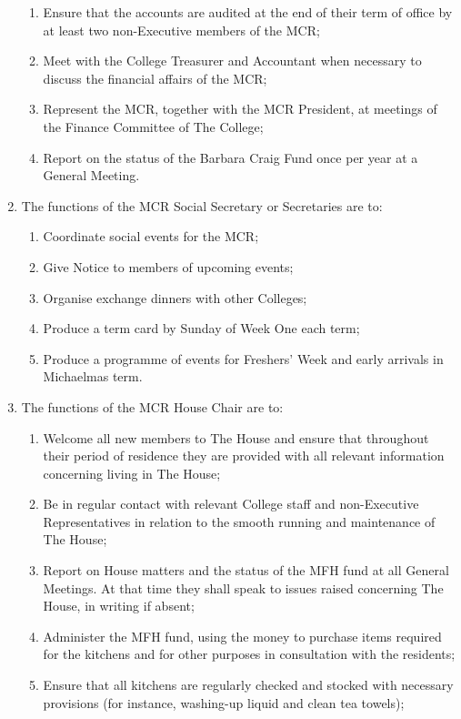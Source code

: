 \documentclass[11pt, a4paper]{article}
\begin{document}
\begin{enumerate}
\begin{enumerate}
        \item Ensure that the accounts are audited at the end of their term of office by at least two non-Executive members of the MCR;
        \item Meet with the College Treasurer and Accountant when necessary to discuss the financial affairs of the MCR;
        \item Represent the MCR, together with the MCR President, at meetings of the Finance Committee of The College;
        \item Report on the status of the Barbara Craig Fund once per year at a General Meeting.
    \end{enumerate}
    \item The functions of the MCR Social Secretary or Secretaries are to:
    \begin{enumerate}
        \item Coordinate social events for the MCR;
        \item Give Notice to members of upcoming events;
        \item Organise exchange dinners with other Colleges;
        \item Produce a term card by Sunday of Week One each term;
        \item Produce a programme of events for Freshers' Week and early arrivals in Michaelmas term.
    \end{enumerate}
    \item The functions of the MCR House Chair are to:
    \begin{enumerate}
        \item Welcome all new members to The House and ensure that throughout their period of residence they are provided with all relevant information concerning living in The House;
        \item Be in regular contact with relevant College staff and non-Executive Representatives in relation to the smooth running and maintenance of The House;
        \item Report on House matters and the status of the MFH fund at all General Meetings. At that time they shall speak to issues raised concerning The House, in writing if absent;
        \item Administer the MFH fund, using the money to purchase items required for the kitchens and for other purposes in consultation with the residents;
        \item Ensure that all kitchens are regularly checked and stocked with necessary provisions (for instance, washing-up liquid and clean tea towels);

\end{enumerate}
\end{enumerate}
\end{document}
